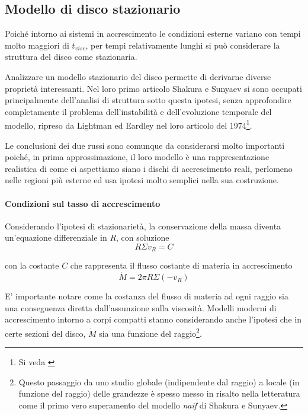 \documentclass[a4paperbi]{article}
\begin{document}
\subsection{Modello di disco stazionario}
	Poiché intorno ai sistemi in accrescimento le condizioni esterne variano con tempi molto maggiori di $t_{visc}$, per tempi relativamente lunghi si può considerare la struttura del disco come stazionaria.
	
	Analizzare un modello stazionario del disco permette di derivarne diverse proprietà interessanti. Nel loro primo articolo Shakura e Sunyaev si sono occupati principalmente dell'analisi di struttura sotto questa ipotesi, senza approfondire completamente il problema dell'instabilità e dell'evoluzione temporale del modello, ripreso da Lightman ed Eardley nel loro articolo del 1974\footnote{Si veda \cite{LightmanEardley1974}}.
	
	Le conclusioni dei due russi sono comunque da considerarsi molto importanti poiché, in prima approssimazione, il loro modello è una rappresentazione realistica di come ci aspettiamo siano i dischi di accrescimento reali, perlomeno nelle regioni più esterne ed usa ipotesi molto semplici nella sua costruzione.
	
	\paragraph{Condizioni sul tasso di accrescimento}
	Considerando l'ipotesi di stazionarietà, la conservazione della massa diventa un'equazione differenziale in $R$, con soluzione
	\begin{equation}
		R\Sigma v_R=C
	\end{equation}
	
	con la costante $C$ che rappresenta il flusso costante di materia in accrescimento
	\begin{equation}
		\dot{M}=2\pi R\Sigma(-v_R)
	\end{equation}
	
	E' importante notare come la costanza del flusso di materia ad ogni raggio sia una conseguenza diretta dall'assunzione sulla viscosità. Modelli moderni di accrescimento intorno a corpi compatti stanno considerando anche l'ipotesi che in certe sezioni del disco, $\dot{M}$ sia una funzione del raggio\footnote{Questo passaggio da uno studio globale (indipendente dal raggio) a locale (in funzione del raggio) delle grandezze è spesso messo in risalto nella letteratura come il primo vero superamento del modello \textit{naif} di Shakura e Sunyaev.}.
	
\end{document}
